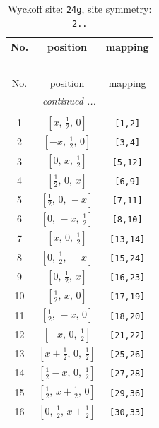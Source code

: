 \documentclass[fleqn,8pt]{jsarticle}
\begin{document}
\renewcommand{\arraystretch}{1.2}
\begin{longtable}{ccc}
\caption{Wyckoff site: {\tt 24g}, site symmetry: {\tt 2..}}
 \\
 \hline \hline
No. & position & mapping \\ \hline \endfirsthead

\multicolumn{2}{l}{\tablename\ \thetable{}} \\
 \hline \hline
No. & position & mapping \\ \hline \endhead

 \hline \hline
\multicolumn{2}{r}{\footnotesize\it continued ...} \\ \endfoot

 \hline \hline
\multicolumn{2}{r}{} \\ \endlastfoot

1 & $\left[ x,\, \frac{1}{2},\, 0 \right]$ & {\tt [1,2]} \\ \hline
2 & $\left[ - x,\, \frac{1}{2},\, 0 \right]$ & {\tt [3,4]} \\ \hline
3 & $\left[ 0,\, x,\, \frac{1}{2} \right]$ & {\tt [5,12]} \\ \hline
4 & $\left[ \frac{1}{2},\, 0,\, x \right]$ & {\tt [6,9]} \\ \hline
5 & $\left[ \frac{1}{2},\, 0,\, - x \right]$ & {\tt [7,11]} \\ \hline
6 & $\left[ 0,\, - x,\, \frac{1}{2} \right]$ & {\tt [8,10]} \\ \hline
7 & $\left[ x,\, 0,\, \frac{1}{2} \right]$ & {\tt [13,14]} \\ \hline
8 & $\left[ 0,\, \frac{1}{2},\, - x \right]$ & {\tt [15,24]} \\ \hline
9 & $\left[ 0,\, \frac{1}{2},\, x \right]$ & {\tt [16,23]} \\ \hline
10 & $\left[ \frac{1}{2},\, x,\, 0 \right]$ & {\tt [17,19]} \\ \hline
11 & $\left[ \frac{1}{2},\, - x,\, 0 \right]$ & {\tt [18,20]} \\ \hline
12 & $\left[ - x,\, 0,\, \frac{1}{2} \right]$ & {\tt [21,22]} \\ \hline
13 & $\left[ x + \frac{1}{2},\, 0,\, \frac{1}{2} \right]$ & {\tt [25,26]} \\ \hline
14 & $\left[ \frac{1}{2} - x,\, 0,\, \frac{1}{2} \right]$ & {\tt [27,28]} \\ \hline
15 & $\left[ \frac{1}{2},\, x + \frac{1}{2},\, 0 \right]$ & {\tt [29,36]} \\ \hline
16 & $\left[ 0,\, \frac{1}{2},\, x + \frac{1}{2} \right]$ & {\tt [30,33]} \\ \hline

\end{longtable}
\end{document}
